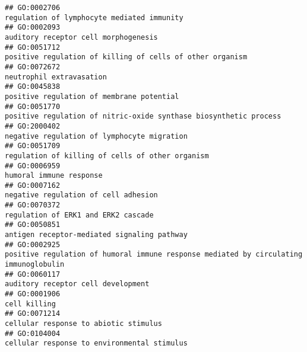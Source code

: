 \documentclass[
]{article}
\begin{document}
\begin{verbatim}
## GO:0002706                                                                                                       regulation of lymphocyte mediated immunity
## GO:0002093                                                                                                             auditory receptor cell morphogenesis
## GO:0051712                                                                                        positive regulation of killing of cells of other organism
## GO:0072672                                                                                                                         neutrophil extravasation
## GO:0045838                                                                                                        positive regulation of membrane potential
## GO:0051770                                                                                positive regulation of nitric-oxide synthase biosynthetic process
## GO:2000402                                                                                                      negative regulation of lymphocyte migration
## GO:0051709                                                                                                 regulation of killing of cells of other organism
## GO:0006959                                                                                                                          humoral immune response
## GO:0007162                                                                                                             negative regulation of cell adhesion
## GO:0070372                                                                                                              regulation of ERK1 and ERK2 cascade
## GO:0050851                                                                                                      antigen receptor-mediated signaling pathway
## GO:0002925                                                            positive regulation of humoral immune response mediated by circulating immunoglobulin
## GO:0060117                                                                                                               auditory receptor cell development
## GO:0001906                                                                                                                                     cell killing
## GO:0071214                                                                                                            cellular response to abiotic stimulus
## GO:0104004                                                                                                      cellular response to environmental stimulus

\end{verbatim}
\end{document}

